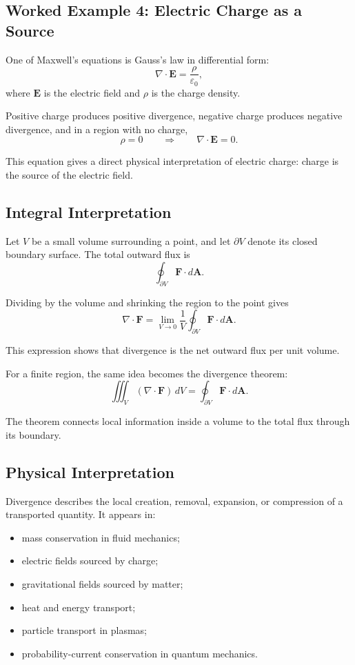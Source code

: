 \subsection{Worked Example 4: Electric Charge as a Source}

One of Maxwell's equations is Gauss's law in differential form:
\[
\boxed{
\nabla\cdot\mathbf E
=
\frac{\rho}{\varepsilon_0},
}
\]
where $\mathbf E$ is the electric field and $\rho$ is the charge density.

Positive charge produces positive divergence, negative charge produces negative
divergence, and in a region with no charge,
\[
\rho=0
\qquad\Longrightarrow\qquad
\nabla\cdot\mathbf E=0.
\]

This equation gives a direct physical interpretation of electric charge:
charge is the source of the electric field.

\subsection{Integral Interpretation}

Let $V$ be a small volume surrounding a point, and let $\partial V$ denote its
closed boundary surface. The total outward flux is
\[
\oint_{\partial V}\mathbf F\cdot d\mathbf A.
\]

Dividing by the volume and shrinking the region to the point gives
\[
\boxed{
\nabla\cdot\mathbf F
=
\lim_{V\to 0}
\frac{1}{V}
\oint_{\partial V}
\mathbf F\cdot d\mathbf A.
}
\]

This expression shows that divergence is the net outward flux per unit volume.

For a finite region, the same idea becomes the divergence theorem:
\[
\boxed{
\iiint_V
(\nabla\cdot\mathbf F)\,dV
=
\oint_{\partial V}
\mathbf F\cdot d\mathbf A.
}
\]

The theorem connects local information inside a volume to the total flux
through its boundary.

\subsection{Physical Interpretation}

Divergence describes the local creation, removal, expansion, or compression of
a transported quantity. It appears in:

\begin{itemize}
\item mass conservation in fluid mechanics;
\item electric fields sourced by charge;
\item gravitational fields sourced by matter;
\item heat and energy transport;
\item particle transport in plasmas;
\item probability-current conservation in quantum mechanics.
\end{itemize}

